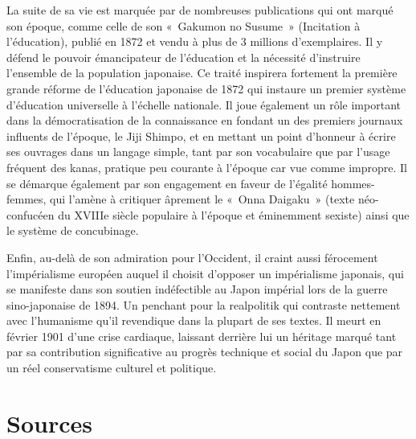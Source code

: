 \documentclass[11pt,a4paper]{article}
\begin{document}
La suite de sa vie est marquée par de nombreuses publications qui ont marqué son époque, comme celle de son «~Gakumon no Susume~» (Incitation à l'éducation), publié en 1872 et vendu à plus de 3 millions d'exemplaires. Il y défend le pouvoir émancipateur de l'éducation et la nécessité d'instruire l'ensemble de la population japonaise. Ce traité inspirera fortement la première grande réforme de l'éducation japonaise de 1872 qui instaure un premier système d'éducation universelle à l'échelle nationale. Il joue également un rôle important dans la démocratisation de la connaissance en fondant un des premiers journaux influents de l'époque, le Jiji Shimpo, et en mettant un point d'honneur à écrire ses ouvrages dans un langage simple, tant par son vocabulaire que par l'usage fréquent des kanas, pratique peu courante à l'époque car vue comme impropre. Il se démarque également par son engagement en faveur de l'égalité hommes-femmes, qui l'amène à critiquer âprement le «~Onna Daigaku~» (texte néo-confucéen du XVIIIe siècle populaire à l'époque et éminemment sexiste) ainsi que le système de concubinage.

Enfin, au-delà de son admiration pour l'Occident, il craint aussi férocement l'impérialisme européen auquel il choisit d'opposer un impérialisme japonais, qui se manifeste dans son soutien indéfectible au Japon impérial lors de la guerre sino-japonaise de 1894. Un penchant pour la realpolitik qui contraste nettement avec l'humanisme qu'il revendique dans la plupart de ses textes. Il meurt en février 1901 d'une crise cardiaque, laissant derrière lui un héritage marqué tant par sa contribution significative au progrès technique et social du Japon que par un réel conservatisme culturel et politique.

\section{Sources}
\small
\end{document}
